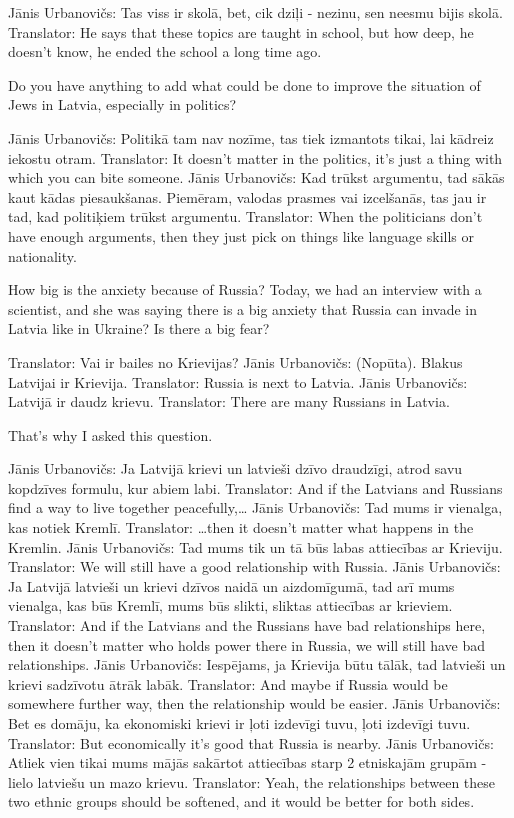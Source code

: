 Jānis Urbanovičs: Tas viss ir skolā, bet, cik dziļi - nezinu, sen neesmu bijis skolā.  
Translator: He says that these topics are taught in school, but how deep, he doesn't know, he ended the school a long time ago. 

Do you have anything to add what could be done to improve the situation of Jews in Latvia, especially in politics?  

Jānis Urbanovičs: Politikā tam nav nozīme, tas tiek izmantots tikai, lai kādreiz iekostu otram.  
Translator: It doesn't matter in the politics, it’s just a thing with which you can bite someone.  
Jānis Urbanovičs: Kad trūkst argumentu, tad sākās kaut kādas piesaukšanas. Piemēram, valodas prasmes vai izcelšanās, tas jau ir tad, kad politiķiem trūkst argumentu.  
Translator: When the politicians don't have enough arguments, then they just pick on things like language skills or nationality. 

How big is the anxiety because of Russia? Today, we had an interview with a scientist, and she was saying there is a big anxiety that Russia can invade in Latvia like in Ukraine? Is there a big fear?  

Translator: Vai ir bailes no Krievijas?  
Jānis Urbanovičs: (Nopūta). Blakus Latvijai ir Krievija.  
Translator: Russia is next to Latvia.  
Jānis Urbanovičs: Latvijā ir daudz krievu. 
Translator: There are many Russians in Latvia.  

That's why I asked this question. 

Jānis Urbanovičs: Ja Latvijā krievi un latvieši dzīvo draudzīgi, atrod savu kopdzīves formulu, kur abiem labi.  
Translator: And if the Latvians and Russians find a way to live together peacefully,…  
Jānis Urbanovičs: Tad mums ir vienalga, kas notiek Kremlī. 
Translator: …then it doesn't matter what happens in the Kremlin.  
Jānis Urbanovičs: Tad mums tik un tā būs labas attiecības ar Krieviju. 
Translator: We will still have a good relationship with Russia.  
Jānis Urbanovičs: Ja Latvijā latvieši un krievi dzīvos naidā un aizdomīgumā, tad arī mums vienalga, kas būs Kremlī, mums būs slikti, sliktas attiecības ar krieviem.  
Translator: And if the Latvians and the Russians have bad relationships here, then it doesn't matter who holds power there in Russia, we will still have bad relationships.  
Jānis Urbanovičs: Iespējams, ja Krievija būtu tālāk, tad latvieši un krievi sadzīvotu ātrāk labāk.  
Translator: And maybe if Russia would be somewhere further way, then the relationship would be easier. 
Jānis Urbanovičs: Bet es domāju, ka ekonomiski krievi ir ļoti izdevīgi tuvu, ļoti izdevīgi tuvu. 
Translator: But economically it's good that Russia is nearby.  
Jānis Urbanovičs: Atliek vien tikai mums mājās sakārtot attiecības starp 2 etniskajām grupām - lielo latviešu un mazo krievu.  
Translator: Yeah, the relationships between these two ethnic groups should be softened, and it would be better for both sides. 

